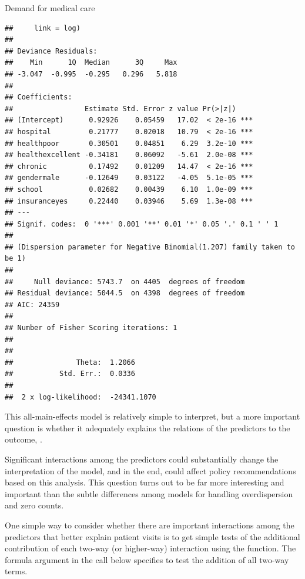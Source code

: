 \documentclass[11pt]{book}\usepackage[]{graphicx}\usepackage[]{color}
\makeatletter
\newenvironment{kframe}{%
 \def\at@end@of@kframe{}%
 \ifinner\ifhmode%
  \def\at@end@of@kframe{\end{minipage}}%
  \begin{minipage}{\columnwidth}%
 \fi\fi%
 \def\FrameCommand##1{\hskip\@totalleftmargin \hskip-\fboxsep
 \colorbox{shadecolor}{##1}\hskip-\fboxsep
     \hskip-\linewidth \hskip-\@totalleftmargin \hskip\columnwidth}%
 \MakeFramed {\advance\hsize-\width
   \@totalleftmargin\z@ \linewidth\hsize
   \@setminipage}}%
 {\par\unskip\endMakeFramed%
 \at@end@of@kframe}
\newenvironment{knitrout}{}{} %
\renewenvironment{knitrout}{\small\renewcommand{\baselinestretch}{.85}}{} %
\makeatother
\begin{document}
\begin{Example}[nmes2]{Demand for medical care}
\begin{knitrout}
\begin{kframe}
\begin{verbatim}
##     link = log)
## 
## Deviance Residuals: 
##    Min      1Q  Median      3Q     Max  
## -3.047  -0.995  -0.295   0.296   5.818  
## 
## Coefficients:
##                 Estimate Std. Error z value Pr(>|z|)    
## (Intercept)      0.92926    0.05459   17.02  < 2e-16 ***
## hospital         0.21777    0.02018   10.79  < 2e-16 ***
## healthpoor       0.30501    0.04851    6.29  3.2e-10 ***
## healthexcellent -0.34181    0.06092   -5.61  2.0e-08 ***
## chronic          0.17492    0.01209   14.47  < 2e-16 ***
## gendermale      -0.12649    0.03122   -4.05  5.1e-05 ***
## school           0.02682    0.00439    6.10  1.0e-09 ***
## insuranceyes     0.22440    0.03946    5.69  1.3e-08 ***
## ---
## Signif. codes:  0 '***' 0.001 '**' 0.01 '*' 0.05 '.' 0.1 ' ' 1
## 
## (Dispersion parameter for Negative Binomial(1.207) family taken to be 1)
## 
##     Null deviance: 5743.7  on 4405  degrees of freedom
## Residual deviance: 5044.5  on 4398  degrees of freedom
## AIC: 24359
## 
## Number of Fisher Scoring iterations: 1
## 
## 
##               Theta:  1.2066 
##           Std. Err.:  0.0336 
## 
##  2 x log-likelihood:  -24341.1070
\end{verbatim}
\end{kframe}
\end{knitrout}

This all-main-effects model is relatively
simple to interpret, but a more important question is whether it
adequately explains the relations of the predictors to the outcome,
.

Significant interactions among the predictors could substantially change
the interpretation of the model, and in the end, could affect policy
recommendations based on this analysis. This question turns out to be
far more interesting and important than the subtle differences among
models for handling overdispersion and zero counts.

One simple way to consider whether there are important interactions
among the predictors that better explain patient visits is to get simple
tests of the additional contribution of each two-way (or higher-way)
interaction using the  function.  The formula argument in
the call below specifies to test the addition of all two-way terms.


\end{Example}
\end{document}
